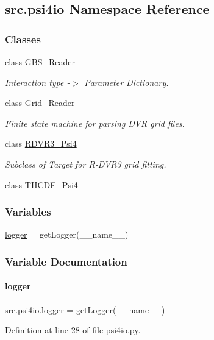 \hypertarget{namespacesrc_1_1psi4io}{}\subsection{src.\+psi4io Namespace Reference}
\label{namespacesrc_1_1psi4io}
\subsubsection*{Classes}
\begin{DoxyCompactItemize}
\item 
class \hyperlink{classsrc_1_1psi4io_1_1GBS__Reader}{G\+B\+S\+\_\+\+Reader}
\begin{DoxyCompactList}\small\item\em Interaction type -\/$>$ Parameter Dictionary. \end{DoxyCompactList}\item 
class \hyperlink{classsrc_1_1psi4io_1_1Grid__Reader}{Grid\+\_\+\+Reader}
\begin{DoxyCompactList}\small\item\em Finite state machine for parsing D\+VR grid files. \end{DoxyCompactList}\item 
class \hyperlink{classsrc_1_1psi4io_1_1RDVR3__Psi4}{R\+D\+V\+R3\+\_\+\+Psi4}
\begin{DoxyCompactList}\small\item\em Subclass of Target for R-\/\+D\+V\+R3 grid fitting. \end{DoxyCompactList}\item 
class \hyperlink{classsrc_1_1psi4io_1_1THCDF__Psi4}{T\+H\+C\+D\+F\+\_\+\+Psi4}
\end{DoxyCompactItemize}
\subsubsection*{Variables}
\begin{DoxyCompactItemize}
\item 
\hyperlink{namespacesrc_1_1psi4io_a1026d29d5283279f4a716aa5386e9911}{logger} = get\+Logger(\+\_\+\+\_\+name\+\_\+\+\_\+)
\end{DoxyCompactItemize}


\subsubsection{Variable Documentation}
\mbox{\label{namespacesrc_1_1psi4io_a1026d29d5283279f4a716aa5386e9911}} 
\paragraph{\texorpdfstring{logger}{logger}}
{\footnotesize\ttfamily src.\+psi4io.\+logger = get\+Logger(\+\_\+\+\_\+name\+\_\+\+\_\+)}



Definition at line 28 of file psi4io.\+py.


